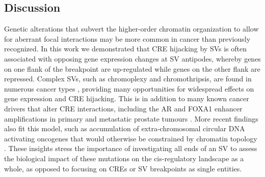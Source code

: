 \subsection{Discussion}

Genetic alterations that subvert the higher-order chromatin organization to allow for aberrant focal interactions may be more common in cancer than previously recognized.
In this work we demonstrated that CRE hijacking by SVs is often associated with opposing gene expression changes at SV antipodes, whereby genes on one flank of the breakpoint are up-regulated while genes on the other flank are repressed.
Complex SVs, such as chromoplexy and chromothripsis, are found in numerous cancer types \cite{bacaPunctuatedEvolutionProstate2013,liPatternsSomaticStructural2020}, providing many opportunities for widespread effects on gene expression and CRE hijacking.
This is in addition to many known cancer drivers that alter CRE interactions, including the AR and FOXA1 enhancer amplifications in primary and metastatic prostate tumours \cite{paroliaDistinctStructuralClasses2019,quigleyGenomicHallmarksStructural2018,takedaSomaticallyAcquiredEnhancer2018,zhouNoncodingMutationsTarget2020,kronTMPRSS2ERGFusion2017,viswanathanStructuralAlterationsDriving2018}.
More recent findings also fit this model, such as accumulation of extra-chromosomal circular DNA activating oncogenes that would otherwise be constrained by chromatin topology \cite{wuCircularEcDNAPromotes2019,kumarATACseqIdentifiesThousands2020,mortonFunctionalEnhancersShape2019,shoshaniChromothripsisDrivesEvolution2021}.
These insights stress the importance of investigating all ends of an SV to assess the biological impact of these mutations on the cis-regulatory landscape as a whole, as opposed to focusing on CREs or SV breakpoints as single entities.

